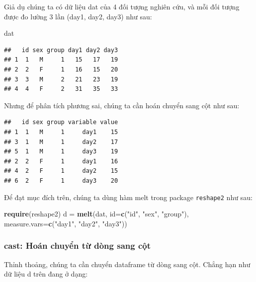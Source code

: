 \documentclass[
]{book}
\newenvironment{Shaded}{\begin{snugshade}}{\end{snugshade}}
\newcommand{\DataTypeTok}[1]{\textcolor[rgb]{0.13,0.29,0.53}{#1}}
\newcommand{\KeywordTok}[1]{\textcolor[rgb]{0.13,0.29,0.53}{\textbf{#1}}}
\newcommand{\NormalTok}[1]{#1}
\newcommand{\StringTok}[1]{\textcolor[rgb]{0.31,0.60,0.02}{#1}}
\begin{document}
Giả dụ chúng ta có dữ liệu dat của 4 đối tượng nghiên cứu, và mỗi đối tượng được đo lường 3 lần (day1, day2, day3) như sau:

\begin{Shaded}
\begin{Highlighting}[]
\NormalTok{dat}
\end{Highlighting}
\end{Shaded}

\begin{verbatim}
##   id sex group day1 day2 day3
## 1  1   M     1   15   17   19
## 2  2   F     1   16   15   20
## 3  3   M     2   21   23   19
## 4  4   F     2   31   35   33
\end{verbatim}

Nhưng để phân tích phương sai, chúng ta cần hoán chuyển sang cột như sau:

\begin{verbatim}
##   id sex group variable value
## 1  1   M     1     day1    15
## 3  1   M     1     day2    17
## 5  1   M     1     day3    19
## 2  2   F     1     day1    16
## 4  2   F     1     day2    15
## 6  2   F     1     day3    20
\end{verbatim}

Để đạt mục đích trên, chúng ta dùng hàm melt trong package \texttt{reshape2} như sau:

\begin{Shaded}
\begin{Highlighting}[]
\KeywordTok{require}\NormalTok{(reshape2)}
\NormalTok{d =}\StringTok{ }\KeywordTok{melt}\NormalTok{(dat, }\DataTypeTok{id=}\KeywordTok{c}\NormalTok{(}\StringTok{"id"}\NormalTok{, }\StringTok{"sex"}\NormalTok{, }\StringTok{"group"}\NormalTok{), }\DataTypeTok{measure.vars=}\KeywordTok{c}\NormalTok{(}\StringTok{"day1"}\NormalTok{, }\StringTok{"day2"}\NormalTok{, }\StringTok{"day3"}\NormalTok{))}
\end{Highlighting}
\end{Shaded}

\hypertarget{cast-houxe1n-chuyux1ec3n-tux1eeb-duxf2ng-sang-cux1ed9t}{%
\subsubsection*{cast: Hoán chuyển từ dòng sang cột}\label{cast-houxe1n-chuyux1ec3n-tux1eeb-duxf2ng-sang-cux1ed9t}}

Thỉnh thoảng, chúng ta cần chuyển dataframe từ dòng sang cột. Chẳng hạn như dữ liệu d trên đang ở dạng:
\end{document}
